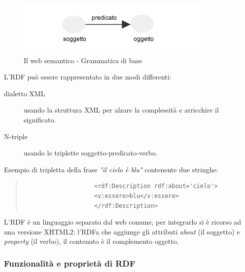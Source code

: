 				\begin{figure}
				\centering
					\includegraphics[scale=0.8]{images/LInformazioneEIlWebSemantico-RDF1}
					\caption{Il web semantico - Grammatica di base}
					\label{fig:LInformazioneEIlWebSemantico-RDF1}
				\end{figure}
				
				L'RDF può essere rappresentato in due modi differenti:
				\begin{description}
					\item[dialetto XML] usando la struttura XML per alzare la complessità e arricchire il significato.
					\item[N-triple] usando le triplette soggetto-predicato-verbo.
				\end{description}
				Esempio di tripletta della frase \emph{"il cielo è blu"} contenente due stringhe:
				\begin{quote}
				\begin{verbatim}
					<rdf:Description rdf:about='cielo'>
					<v:essere>blu</v:essere>
					</rdf:Description>
				\end{verbatim}
				\end{quote}
				
				L'RDF è un linguaggio separato dal web comune, per integrarlo si è ricorso ad una versione XHTML2: l'RDFa che aggiunge gli attributi \emph{about} (il soggetto) e \emph{property} (il verbo), il contenuto è il complemento oggetto.
				
			
			\subsubsection{Funzionalità e proprietà di RDF}
			
